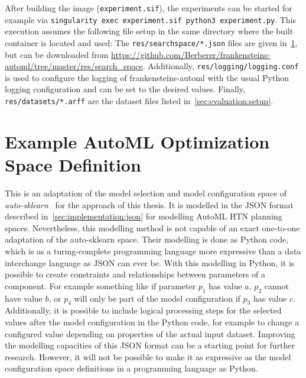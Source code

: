 After building the image (\texttt{experiment.sif}), the experiments can be started for example via \texttt{singularity exec experiment.sif python3 experiment.py}.\newline
This execution assumes the following file setup in the same directory where the built container is located and used:
The \texttt{res/searchspace/*.json} files are given in~\ref{sec:appendix:htn-space}, but can be downloaded from \url{https://github.com/Berberer/frankensteins-automl/tree/master/res/search_space}.
Additionally, \texttt{res/logging/logging.conf} is used to configure the logging of frankensteins-automl with the usual Python logging configuration and can be set to the desired values.
Finally, \texttt{res/datasets/*.arff} are the dataset files listed in~\ref{sec:evaluation:setup}.

\section{Example AutoML Optimization Space Definition}
\label{sec:appendix:htn-space}
This is an adaptation of the model selection and model configuration space of \textit{auto-sklearn}~\cite{Feurer-AutoSklearn} for the approach of this thesis.
It is modelled in the JSON format described in~\ref{sec:implementation:json} for modelling AutoML HTN planning spaces.\newline
Nevertheless, this modelling method is not capable of an exact one-to-one adaptation of the auto-sklearn space.
Their modelling is done as Python code, which is as a turing-complete programming language more expressive than a data interchange language as JSON can ever be.
With this modelling in Python, it is possible to create constraints and relationships between parameters of a component.
For example something like if parameter $p_1$ has value $a$, $p_2$ cannot have value $b$, or $p_4$ will only be part of the model configuration if $p_3$ has value $c$.\newline
Additionally, it is possible to include logical processing steps for the selected values after the model configuration in the Python code, for example to change a configured value depending on properties of the actual input dataset.\newline
Improving the modelling capacities of this JSON format can be a starting point for further research.
However, it will not be possible to make it as expressive as the model configuration space definitions in a programming language as Python.

